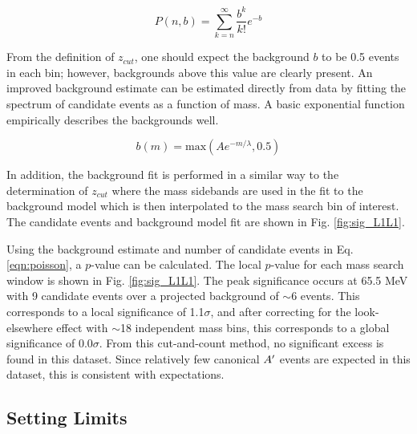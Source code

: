 \begin{equation}
    P(n,b) = \sum_{k=n}^{\infty} \frac{b^k}{k!}e^{-b}
    \label{eqn:poisson}
\end{equation}

From the definition of $z_{cut}$, one should expect the background $b$ to be 0.5 events in each bin; however, backgrounds above this value are clearly present. An improved background estimate can be estimated directly from data by fitting the spectrum of candidate events as a function of mass. A basic exponential function empirically describes the backgrounds well.

\begin{equation}
    b(m) = \mathrm{max} \left( Ae^{-m/\lambda},0.5 \right)
    \label{eqn:sig_background}
\end{equation}

In addition, the background fit is performed in a similar way to the determination of $z_{cut}$ where the mass sidebands are used in the fit to the background model which is then interpolated to the mass search bin of interest. The candidate events and background model fit are shown in Fig. \ref{fig:sig_L1L1}.

Using the background estimate and number of candidate events in Eq. \ref{eqn:poisson}, a $p$-value can be calculated. The local $p$-value for each mass search window is shown in Fig. \ref{fig:sig_L1L1}. The peak significance occurs at 65.5 MeV with 9 candidate events over a projected background of $\sim$6 events. This corresponds to a local significance of 1.1$\sigma$, and after correcting for the look-elsewhere effect with $\sim$18 independent mass bins, this corresponds to a global significance of 0.0$\sigma$. From this cut-and-count method, no significant excess is found in this dataset. Since relatively few canonical $A^\prime$ events are expected in this dataset, this is consistent with expectations.

\clearpage

\subsection{Setting Limits}\label{sec:aplimits}

